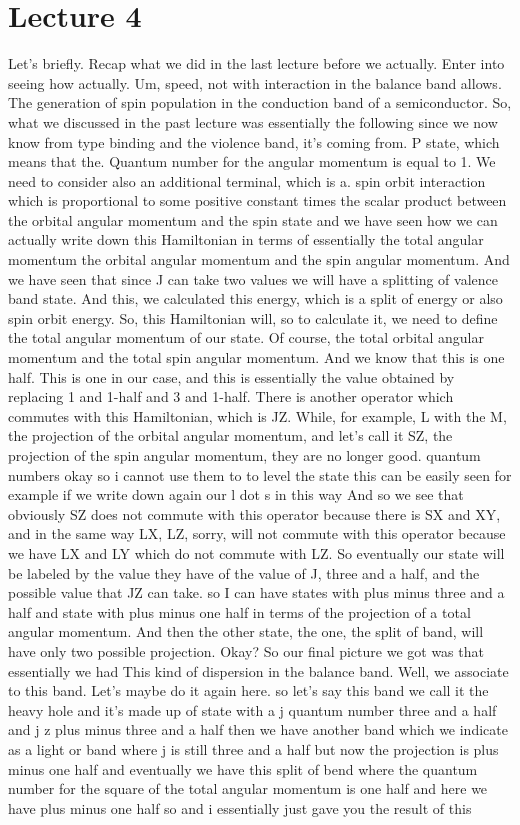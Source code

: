 \chapter{Lecture 4}
Let's briefly. Recap what we did in the last lecture before we actually. Enter into seeing how actually. Um, speed, not with interaction in the balance band allows. The generation of spin population in the conduction band of a semiconductor. So, what we discussed in the past lecture was essentially the following since we now know from type binding and the violence band, it's coming from. P state, which means that the. Quantum number for the angular momentum is equal to 1. We need to consider also an additional terminal, which is a. spin orbit interaction which is proportional to some positive constant times the scalar product between the orbital angular momentum and the spin state and we have seen how we can actually write down this Hamiltonian in terms of essentially the total angular momentum the orbital angular momentum and the spin angular momentum. And we have seen that since J can take two values we will have a splitting of valence band state. And this, we calculated this energy, which is a split of energy or also spin orbit energy. So, this Hamiltonian will, so to calculate it, we need to define the total angular momentum of our state. Of course, the total orbital angular momentum and the total spin angular momentum. And we know that this is one half. This is one in our case, and this is essentially the value obtained by replacing 1 and 1-half and 3 and 1-half. There is another operator which commutes with this Hamiltonian, which is JZ. While, for example, L with the M, the projection of the orbital angular momentum, and let's call it SZ, the projection of the spin angular momentum, they are no longer good. quantum numbers okay so i cannot use them to to level the state this can be easily seen for example if we write down again our l dot s in this way And so we see that obviously SZ does not commute with this operator because there is SX and XY, and in the same way LX, LZ, sorry, will not commute with this operator because we have LX and LY which do not commute with LZ. So eventually our state will be labeled by the value they have of the value of J, three and a half, and the possible value that JZ can take. so I can have states with plus minus three and a half and state with plus minus one half in terms of the projection of a total angular momentum. And then the other state, the one, the split of band, will have only two possible projection. Okay? So our final picture we got was that essentially we had This kind of dispersion in the balance band. Well, we associate to this band. Let's maybe do it again here. so let's say this band we call it the heavy hole and it's made up of state with a j quantum number three and a half and j z plus minus three and a half then we have another band which we indicate as a light or band where j is still three and a half but now the projection is plus minus one half and eventually we have this split of bend where the quantum number for the square of the total angular momentum is one half and here we have plus minus one half so and i essentially just gave you the result of this 